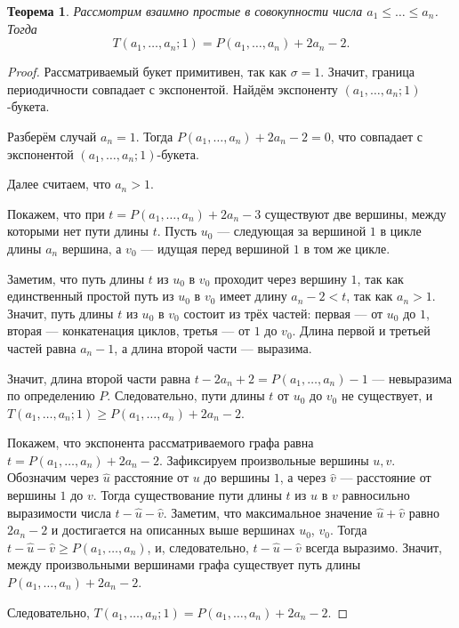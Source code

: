 \documentclass[12pt]{article}
\newtheorem{theorem}{Теорема}[section]
\theoremstyle{definition}
\begin{document}
\begin{theorem}
\label{thTP}
Рассмотрим взаимно простые в совокупности числа $a_1 \le \dots \le a_n$. Тогда
\begin{equation*}
T(a_1, \dots, a_n; 1) = P(a_1, \dots, a_n) + 2a_n - 2.
\end{equation*}
\end{theorem}
\begin{proof}
Рассматриваемый букет примитивен, так как $\sigma = 1$. Значит, граница периодичности совпадает с экспонентой. Найдём экспоненту $(a_1, \dots, a_n; 1)$-букета.

Разберём случай $a_n = 1$. Тогда $P(a_1, \dots, a_n) + 2a_n - 2 = 0$, что совпадает с экспонентой $(a_1, \dots, a_n; 1)$-букета.

Далее считаем, что $a_n > 1$.

Покажем, что при $t = P(a_1, \dots, a_n) + 2a_n - 3$ существуют две вершины, между которыми нет пути длины $t$. Пусть $u_0$ --- следующая за вершиной $1$ в цикле длины $a_n$ вершина, а $v_0$ --- идущая перед вершиной $1$ в том же цикле.

Заметим, что путь длины $t$ из $u_0$ в $v_0$ проходит через вершину $1$, так как единственный простой путь из $u_0$ в $v_0$ имеет длину $a_n - 2 < t$, так как $a_n > 1$. Значит, путь длины $t$ из $u_0$ в $v_0$ состоит из трёх частей: первая --- от $u_0$ до $1$, вторая --- конкатенация циклов, третья --- от $1$ до $v_0$. Длина первой и третьей частей равна $a_n - 1$, а длина второй части --- выразима. 

Значит, длина второй части равна $t - 2a_n + 2 = P(a_1, \dots, a_n) - 1$ --- невыразима по определению $P$. Следовательно, пути длины $t$ от $u_0$ до $v_0$ не существует, и $T(a_1, \dots, a_n; 1) \ge P(a_1, \dots, a_n) + 2a_n - 2$.

Покажем, что экспонента рассматриваемого графа равна $t = P(a_1, \dots, a_n) + 2a_n - 2$. Зафиксируем произвольные вершины $u, v$. Обозначим через $\hat{u}$ расстояние от $u$ до вершины $1$, а через $\hat{v}$ --- расстояние от вершины $1$ до $v$. Тогда существование пути длины $t$ из $u$ в $v$ равносильно выразимости числа $t - \hat{u} - \hat{v}$. Заметим, что максимальное значение $\hat{u} + \hat{v}$ равно $2a_n - 2$ и достигается на описанных выше вершинах $u_0$, $v_0$. Тогда $t - \hat{u} - \hat{v} \ge P(a_1, \dots, a_n)$, и, следовательно, $t - \hat{u} - \hat{v}$ всегда выразимо. Значит, между произвольными вершинами графа существует путь длины $P(a_1, \dots, a_n) + 2a_n - 2$.

Следовательно, $T(a_1, \dots, a_n; 1) = P(a_1, \dots, a_n) + 2a_n - 2$.
\end{proof}
\end{document}
